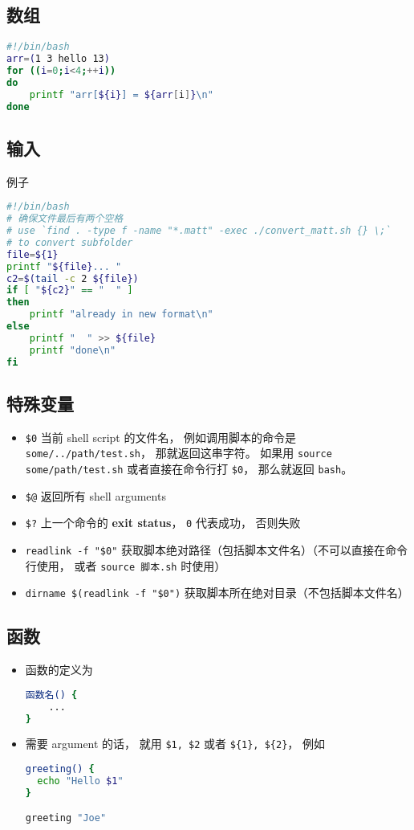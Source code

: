 \subsection{数组}
\begin{lstlisting}[language=bash]
#!/bin/bash
arr=(1 3 hello 13)
for ((i=0;i<4;++i))
do
    printf "arr[${i}] = ${arr[i]}\n"
done
\end{lstlisting}


\subsection{输入}
例子
\begin{lstlisting}[language=bash]
#!/bin/bash
# 确保文件最后有两个空格
# use `find . -type f -name "*.matt" -exec ./convert_matt.sh {} \;`
# to convert subfolder
file=${1}
printf "${file}... "
c2=$(tail -c 2 ${file})
if [ "${c2}" == "  " ]
then
	printf "already in new format\n"
else
	printf "  " >> ${file}
	printf "done\n"
fi
\end{lstlisting}

\subsection{特殊变量}
\begin{itemize}
\item \verb`$0` 当前 shell script 的文件名， 例如调用脚本的命令是 \verb|some/../path/test.sh|， 那就返回这串字符。 如果用 \verb|source some/path/test.sh| 或者直接在命令行打 \verb|$0|， 那么就返回 \verb|bash|。
\item \verb`$@` 返回所有 shell arguments
\item \verb|$?| 上一个命令的 \textbf{exit status}， \verb|0| 代表成功， 否则失败
\item \verb|readlink -f "$0"| 获取脚本绝对路径（包括脚本文件名）（不可以直接在命令行使用， 或者 \verb|source 脚本.sh| 时使用）
\item \verb|dirname $(readlink -f "$0")| 获取脚本所在绝对目录（不包括脚本文件名）
\end{itemize}

\subsection{函数}

\begin{itemize}
\item 函数的定义为
\begin{lstlisting}[language=bash]
函数名() {
	...
}
\end{lstlisting}
\item 需要 argument 的话， 就用 \verb|$1, $2| 或者 \verb|${1}, ${2}|， 例如
\begin{lstlisting}[language=bash]
greeting() {
  echo "Hello $1"
}

greeting "Joe"
\end{lstlisting}
\end{itemize}

